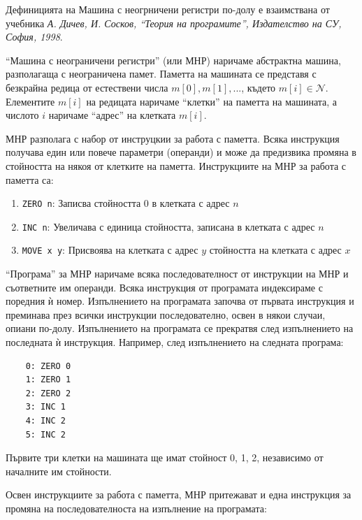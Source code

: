 \documentclass[12pt,a4paper]{article}
\newcommand{\code}[1]{\texttt{#1}}
\begin{document}
\small{Дефиницията на Машина с неогрничени регистри по-долу е взаимствана от учебника \cite{tprog}\textit{А. Дичев, И. Сосков, ``Теория на програмите'', Издателство на СУ, София, 1998}.

\vspace{20px}

\begin{mdframed}[hidealllines=true,backgroundcolor=gray!20]

	``Машина с неограничени регистри'' (или МНР) наричаме абстрактна машина, разполагаща с неограничена памет. Паметта на машината се представя с безкрайна редица от естествени числа $m[0],m[1],...$, където $m[i] \in \mathcal{N}$. Елементите $m[i]$ на редицата наричаме ``клетки'' на паметта на машината, а числото $i$ наричаме ``адрес'' на клетката $m[i]$.

	 МНР разполага с набор от инструцкии за работа с паметта. Всяка инструкция получава един или повече параметри (операнди) и може да предизвика промяна в стойността на някоя от клетките на паметта. Инструкциите на МНР за работа с паметта са:

	\begin{enumerate}[label=\arabic*)]
		\item \code{ZERO n}: Записва стойността 0 в клетката с адрес $n$
		\item \code{INC n}: Увеличава с единица стойността, записана в клетката с адрес $n$
		\item \code{MOVE x y}: Присвоява на клетката с адрес $y$ стойността на клетката с адрес $x$
	\end{enumerate}

	``Програма'' за МНР наричаме всяка последователност от инструкции на МНР и съответните им операнди. Всяка инструкция от програмата индексираме с поредния ѝ номер. Изпълнението на програмата започва от първата инструкция и преминава през всички инструкции последователно, освен в някои случаи, опиани по-долу. Изпълнението на програмата се прекратвя след изпълнението на последната ѝ инструкция. Например, след изпълнението на следната програма:

	\begin{verbatim}
	0: ZERO 0
	1: ZERO 1
	2: ZERO 2
	3: INC 1
	4: INC 2
	5: INC 2
	\end{verbatim}

	Първите три клетки на машината ще имат стойност 0, 1, 2, независимо от началните им стойности.

	Освен инструкциите за работа с паметта, МНР притежават и една инструкция за промяна на последователноста на изпълнение на програмата:


\end{mdframed}}
\end{document}
